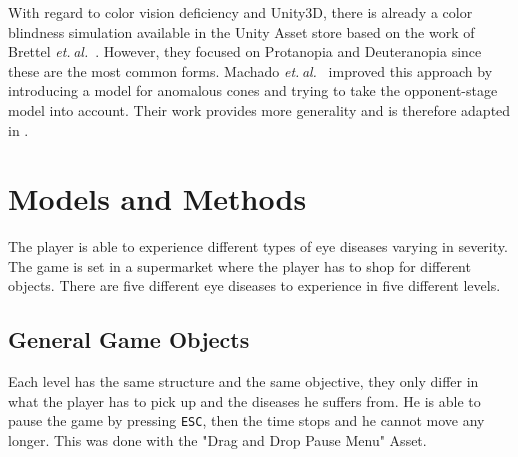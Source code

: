 \documentclass{sig-alternate-05-2015}
\newcommand{\etal}{\textit{et. al.}}
\begin{document}
With regard to color vision deficiency and Unity3D, there is already a color blindness simulation available in the Unity Asset store based on the work of Brettel \etal~\cite{brettel}.
However, they focused on Protanopia and Deuteranopia since these are the most common forms.
Machado \etal~\cite{Machado2009} improved this approach by introducing a model for anomalous cones and trying to take the opponent-stage model into account.
Their work provides more generality and is therefore adapted in .

\section{Models and Methods}

The player is able to experience different types of eye diseases varying in severity. The game is set in a supermarket where the player has to shop for different objects. There are five different eye diseases to experience in five different levels.

\subsection{General Game Objects}

Each level has the same structure and the same objective, they only differ in what the player has to pick up and the diseases he suffers from.
He is able to pause the game by pressing \texttt{ESC}, then the time stops and he cannot move any longer.
This was done with the "Drag and Drop Pause Menu" Asset. 
\end{document}
